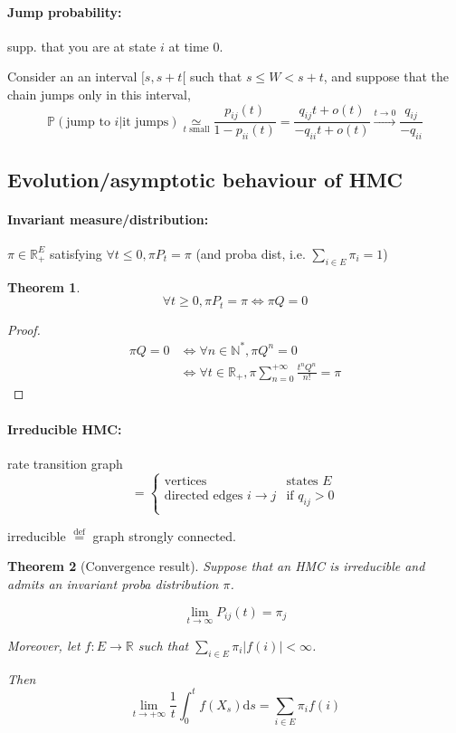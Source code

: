 \documentclass{article}
\newcommand{\deriv}{\mathrm{d}}
\newtheorem{thm}{Theorem}
\begin{document}
\paragraph{Jump probability:} supp. that you are at state $i$ at time 0.

Consider an an interval $[s,s+t[$ such that $s\leq W < s+t$, and suppose that the chain jumps only in this interval,
\[ \mathbb{P} (\text{jump to } i | \text{it jumps})
\underset{t \text{ small}}{\simeq} \frac{p_{ij}(t)}{1-p_{ii}(t)}
=\frac{q_{ij}t+o(t)}{-q_{ii}t+o(t)}
\overset{t\to 0}{\to} \frac{q_{ij}}{-q_{ii}}\]


\subsection*{Evolution/asymptotic behaviour of HMC}

\paragraph{Invariant measure/distribution:} $\pi \in \mathbb{R}_+^E$ satisfying  $\forall t \leq 0, \pi P_t=\pi$ (and proba dist, i.e. $\sum_{i\in E} \pi_i =1$)

\begin{thm}
\[\forall t \geq 0, \pi P_t =\pi \Leftrightarrow \pi Q = 0\]
\end{thm}

\begin{proof}
\begin{align*}
\pi Q = 0 & \Leftrightarrow	\forall n \in \mathbb{N}^*, \pi Q^n = 0\\
& \Leftrightarrow \forall t \in \mathbb{R}_+, \pi \sum_{n=0}^{+\infty} \frac{t^nQ^n}{n!}=\pi
\end{align*}
\end{proof}


\paragraph{Irreducible HMC:} rate transition graph
\[
= \begin{cases}
\text{vertices} & \text{states } E\\
\text{directed edges } i\to j  & \text{if } q_{ij}>0\\
\end{cases}
\]

irreducible $\overset{\text{def}}{=}$ graph strongly connected.

\begin{thm}[Convergence result]
Suppose that an HMC is irreducible and admits an invariant proba distribution $\pi$.

\[\lim_{t\to\infty} P_{ij}(t)=\pi_j\]

Moreover, let $f:E\to \mathbb{R}$ such that $\sum_{i\in E} \pi_i |f(i)| < \infty$.

Then 
\[\lim_{t\to + \infty} \frac{1}{t} \int_0^t f(X_s) \deriv s = \sum_{i\in E} \pi_i f(i) \]
\end{thm}
\end{document}
